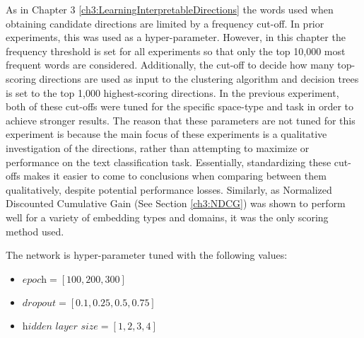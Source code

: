 As in Chapter 3 \ref{ch3:LearningInterpretableDirections} the words used when obtaining candidate directions are limited by a  frequency cut-off. In prior experiments, this was used as a  hyper-parameter. However, in this chapter the frequency threshold is set for all experiments so that only the   top 10,000 most frequent words are considered. Additionally, the cut-off to decide how many top-scoring directions are used as input to the clustering algorithm and decision trees is set to the top 1,000 highest-scoring directions. In the previous experiment, both of these cut-offs were tuned for the specific space-type and task in order to achieve stronger results. The reason that these parameters are not tuned for this experiment is because the main focus of these experiments is a qualitative investigation of the directions, rather than attempting to maximize  or  performance on the text classification task. Essentially, standardizing these cut-offs makes it easier to come to conclusions when comparing between them qualitatively, despite potential performance losses. Similarly, as Normalized Discounted Cumulative Gain (See Section \ref{ch3:NDCG}) was shown to perform well for a variety of embedding types and domains, it was the only scoring method used.




The network is hyper-parameter tuned with the following values: 

\begin{itemize}
	\item $\textit{epoch} = [100, 200, 300]$
	\item $\textit{dropout} = [0.1, 0.25, 0.5, 0.75]$
	\item $\textit{hidden layer size} =[1,  2, 3, 4]$
\end{itemize}

